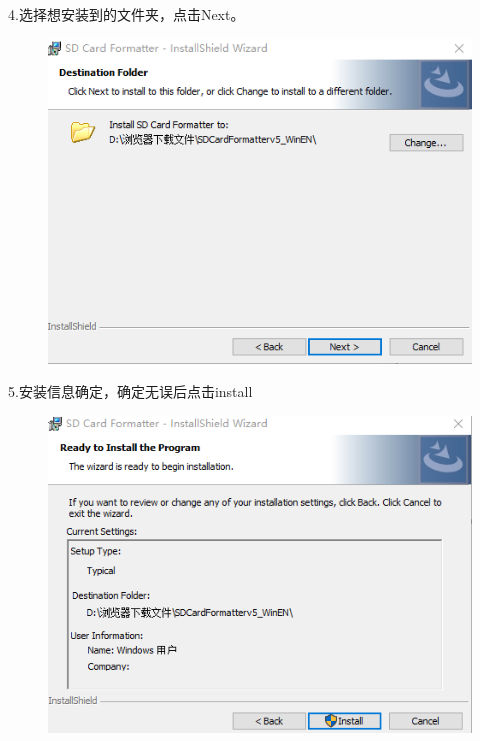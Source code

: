 \documentclass[openbib]{article}
\begin{document}
4.选择想安装到的文件夹，点击Next。
\begin{figure}[H]
	\centering
	\includegraphics[scale=0.4]{a5}
\end{figure}

5.安装信息确定，确定无误后点击install
\begin{figure}[H]
	\centering
	\includegraphics[scale=0.35]{a6}
\end{figure}
\end{document}
